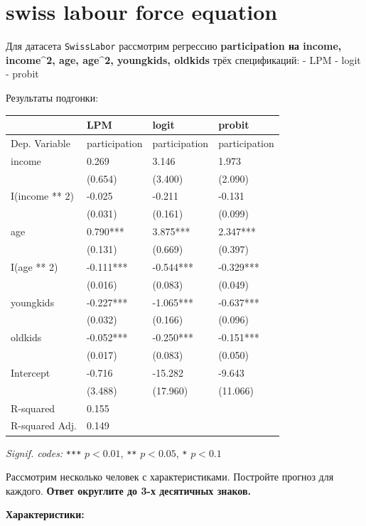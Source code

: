 \documentclass[
  russian,
]{article}
\newcounter{none} %
\begin{document}
\section{swiss labour force equation}\label{swiss-labour-force-equation}

Для датасета \texttt{SwissLabor} рассмотрим регрессию
\textbf{participation на income, income\^{}2, age, age\^{}2, youngkids,
oldkids} трёх спецификаций: - LPM - logit - probit

Результаты подгонки:

{\def\LTcaptype{none} %
\begin{longtable}[]{@{}llll@{}}
\toprule\noalign{}
& LPM & logit & probit \\
\midrule\noalign{}
\endhead
\bottomrule\noalign{}
\endlastfoot
Dep. Variable & participation & participation & participation \\
income & 0.269 & 3.146 & 1.973 \\
& (0.654) & (3.400) & (2.090) \\
I(income ** 2) & -0.025 & -0.211 & -0.131 \\
& (0.031) & (0.161) & (0.099) \\
age & 0.790*** & 3.875*** & 2.347*** \\
& (0.131) & (0.669) & (0.397) \\
I(age ** 2) & -0.111*** & -0.544*** & -0.329*** \\
& (0.016) & (0.083) & (0.049) \\
youngkids & -0.227*** & -1.065*** & -0.637*** \\
& (0.032) & (0.166) & (0.096) \\
oldkids & -0.052*** & -0.250*** & -0.151*** \\
& (0.017) & (0.083) & (0.050) \\
Intercept & -0.716 & -15.282 & -9.643 \\
& (3.488) & (17.960) & (11.066) \\
R-squared & 0.155 & & \\
R-squared Adj. & 0.149 & & \\
\end{longtable}
}

\emph{Signif. codes:} \texttt{***} \(p<0.01\), \texttt{**} \(p<0.05\),
\texttt{*} \(p<0.1\)

Рассмотрим несколько человек с характеристиками. Постройте прогноз для
каждого. \textbf{Ответ округлите до 3-х десятичных знаков.}

\textbf{Характеристики:}
\end{document}
